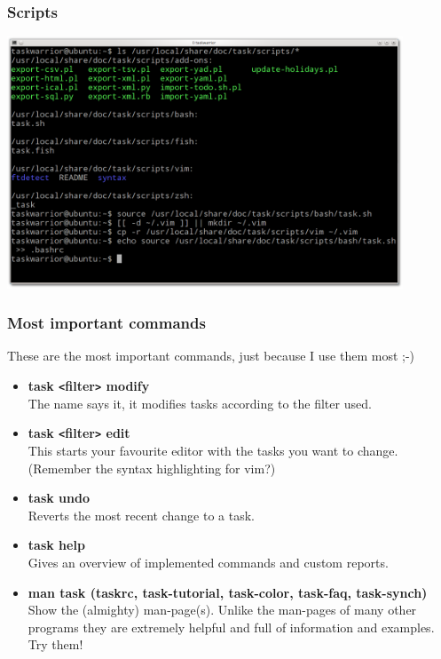 \documentclass[t,handout]{beamer}
\begin{document}
\begin{frame}[fragile]\frametitle{Scripts}
\begin{center} %
\includegraphics[width=11.8cm,height=7.5cm]{scripts.png}
\end{center}
\end{frame}

\begin{frame}\frametitle{Most important commands}

These are the most important commands, just because I use them most ;-)

\begin{itemize}
\item \textbf{task {\tt<}filter{\tt>} modify} \\
The name says it, it modifies tasks according to the filter used. \pause
\item \textbf{task {\tt<}filter{\tt>} edit} \\
This starts your favourite editor with the tasks you want to change. \\
(Remember the syntax highlighting for vim?) \pause
\item \textbf{task undo} \\
Reverts the most recent change to a task. \pause
\item \textbf{task help} \\
Gives an overview of implemented commands and custom reports. \pause
\item \textbf{man task (taskrc, task-tutorial, task-color, task-faq, task-synch)} \\
Show the (almighty) man-page(s). Unlike the man-pages of many other 
programs they are extremely helpful and full of information and examples. 
Try them!
\end{itemize}
\end{frame}
\end{document}
